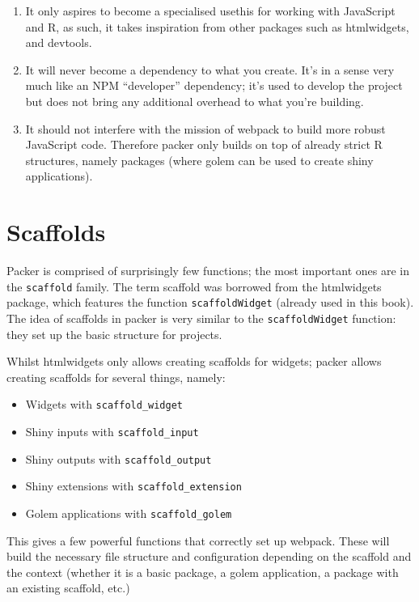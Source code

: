 \documentclass[10pt,]{krantz}
\providecommand{\tightlist}{%
  \setlength{\itemsep}{0pt}\setlength{\parskip}{0pt}}
\begin{document}
\begin{enumerate}
\def\labelenumi{\arabic{enumi}.}
\tightlist
\item
  It only aspires to become a specialised usethis for working with JavaScript and R, as such, it takes inspiration from other packages such as htmlwidgets, and devtools.
\item
  It will never become a dependency to what you create. It's in a sense very much like an NPM ``developer'' dependency; it's used to develop the project but does not bring any additional overhead to what you're building.
\item
  It should not interfere with the mission of webpack to build more robust JavaScript code. Therefore packer only builds on top of already strict R structures, namely packages (where golem can be used to create shiny applications).
\end{enumerate}

\hypertarget{packer-scaffolds}{%
\section{Scaffolds}\label{packer-scaffolds}}

Packer is comprised of surprisingly few functions; the most important ones are in the \texttt{scaffold} family. The term scaffold was borrowed from the htmlwidgets package, which features the function \texttt{scaffoldWidget} (already used in this book). The idea of scaffolds in packer is very similar to the \texttt{scaffoldWidget} function: they set up the basic structure for projects.

Whilst htmlwidgets only allows creating scaffolds for widgets; packer allows creating scaffolds for several things, namely:

\begin{itemize}
\tightlist
\item
  Widgets with \texttt{scaffold\_widget}
\item
  Shiny inputs with \texttt{scaffold\_input}
\item
  Shiny outputs with \texttt{scaffold\_output}
\item
  Shiny extensions with \texttt{scaffold\_extension}
\item
  Golem applications with \texttt{scaffold\_golem}
\end{itemize}

This gives a few powerful functions that correctly set up webpack. These will build the necessary file structure and configuration depending on the scaffold and the context (whether it is a basic package, a golem application, a package with an existing scaffold, etc.)
\end{document}
